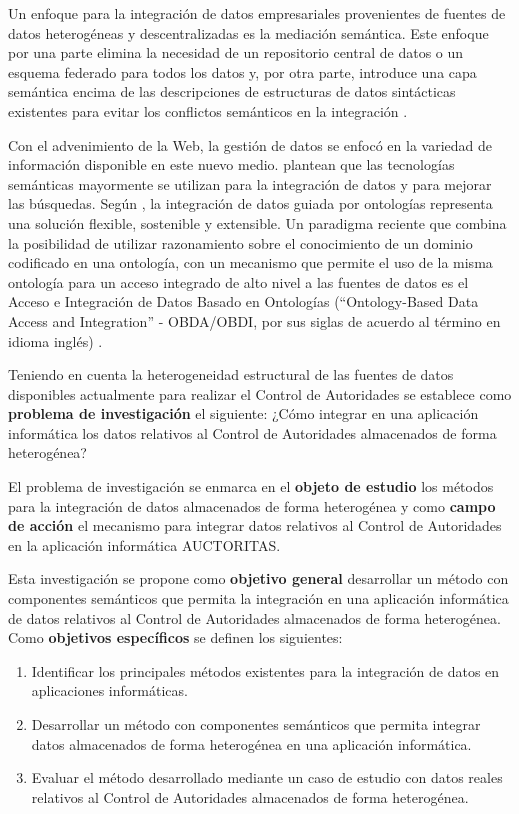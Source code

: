 Un enfoque para la integración de datos empresariales provenientes de fuentes de datos heterogéneas y descentralizadas es la mediación semántica. Este enfoque por una parte elimina la necesidad de un repositorio central de datos o un esquema federado para todos los datos y, por otra parte, introduce una capa semántica encima de las descripciones de estructuras de datos sintácticas existentes para evitar los conflictos semánticos en la integración \citep{ElKadiri2015}. 

Con el advenimiento de la Web, la gestión de datos se enfocó en la variedad de información disponible en este nuevo medio. \cite{Janev2011} plantean que las tecnologías semánticas mayormente se utilizan para la integración de datos y para mejorar las búsquedas. Según \citep{Hoang2014}, la integración de datos guiada por ontologías representa una solución flexible, sostenible y extensible. Un paradigma reciente que combina la posibilidad de utilizar razonamiento sobre el conocimiento de un dominio codificado en una ontología, con un mecanismo que permite el uso de la misma ontología para un acceso integrado de alto nivel a las fuentes de datos es el Acceso e Integración de Datos Basado en Ontologías (``Ontology-Based Data Access and Integration'' - OBDA/OBDI, por sus siglas de acuerdo al término en idioma inglés) \citep{Calvanese2016,Calvanese2017}.

Teniendo en cuenta la heterogeneidad estructural de las fuentes de datos disponibles actualmente para realizar el Control de Autoridades se establece como \textbf{problema de investigación} el siguiente: ¿Cómo integrar en una aplicación informática los datos relativos al Control de Autoridades almacenados de forma heterogénea?

El problema de investigación se enmarca en el \textbf{objeto de estudio} los métodos para la integración de datos almacenados de forma heterogénea y como \textbf{campo de acción} el mecanismo para integrar datos relativos al Control de Autoridades en la aplicación informática AUCTORITAS.

Esta investigación se propone como \textbf{objetivo general} desarrollar un método con componentes semánticos que permita la integración en una aplicación informática de datos relativos al Control de Autoridades almacenados de forma heterogénea. Como \textbf{objetivos específicos} se definen los siguientes:

\begin{enumerate}
\item Identificar los principales métodos existentes para la integración de datos en aplicaciones informáticas.
\item Desarrollar un método con componentes semánticos que permita integrar datos almacenados de forma heterogénea en una aplicación informática.
\item Evaluar el método desarrollado mediante un caso de estudio con datos reales relativos al Control de Autoridades almacenados de forma heterogénea.
\end{enumerate}

